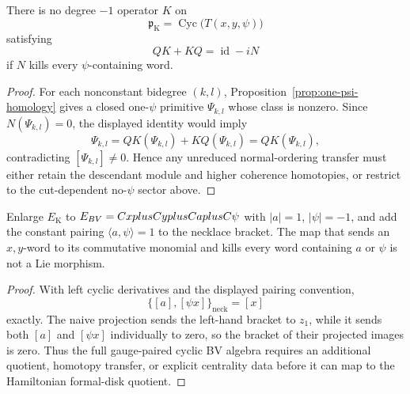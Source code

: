 \documentclass[11pt]{memoir}
\begin{document}
\begin{lem}
\label{lem:no-full-cyclic-normal-ordering-contraction}
  There is no degree \(-1\) operator \(K\) on
  \[
    \mathfrak p_{\mathrm K}
      =\operatorname{Cyc}\bigl(T(x,y,\psi)\bigr)
  \]
  satisfying
  \[
    QK+KQ=\operatorname{id}-iN
  \]
  if \(N\) kills every \(\psi\)-containing word.
\end{lem}

\begin{proof}
  For each nonconstant bidegree \((k,l)\), Proposition~\ref{prop:one-psi-homology}
  gives a closed one-\(\psi\) primitive \(\Psi_{k,l}\) whose class is nonzero.
  Since \(N(\Psi_{k,l})=0\), the displayed identity would imply
  \[
    \Psi_{k,l}=QK(\Psi_{k,l})+KQ(\Psi_{k,l})=QK(\Psi_{k,l}),
  \]
  contradicting \([\Psi_{k,l}]\ne0\).  Hence any unreduced normal-ordering
  transfer must either retain the descendant module and higher coherence
  homotopies, or restrict to the cut-dependent no-\(\psi\) sector above.
\end{proof}

\begin{lem}
\label{lem:gauge-paired-necklace-naive-quotient-fails}
  Enlarge \(E_{\mathrm K}\) to
  \(E_{BV}=C xplusC yplusC aplusC\psi\) with
  \(|a|=1\), \(|\psi|=-1\), and add the constant pairing
  \(\langle a,\psi\rangle=1\) to the necklace bracket.  The map that sends
  an \(x,y\)-word to its commutative monomial and kills every word
  containing \(a\) or \(\psi\) is not a Lie morphism.
\end{lem}

\begin{proof}
	  With left cyclic derivatives and the displayed pairing convention,
	  \[
	    \{[a],[\psi x]\}_{\mathrm{neck}}=[x]
	  \]
	  exactly.  The naive
  projection sends the left-hand bracket to \(z_1\), while it sends both
  \([a]\) and \([\psi x]\) individually to zero, so the bracket of their
  projected images is zero.  Thus the full gauge-paired cyclic BV algebra
  requires an additional quotient, homotopy transfer, or explicit
  centrality data before it can map to the Hamiltonian formal-disk
  quotient.
\end{proof}
\end{document}
